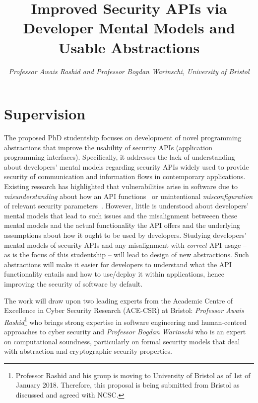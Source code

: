 \documentclass[10pt]{article}
\date{}
\title{\bf{Improved Security APIs via Developer Mental Models and Usable Abstractions}}
\author{\textit{Professor Awais Rashid and Professor Bogdan Warinschi, University of Bristol}}
\begin{document}
\maketitle


\section{Supervision}

The proposed PhD studentship focuses on development of novel programming abstractions that improve the usability of security APIs (application programming interfaces). Specifically, it addresses the lack of understanding about developers' mental models regarding security APIs widely used to provide security of communication and information flows in contemporary applications. Existing research has highlighted that vulnerabilities arise in software due to \emph{misunderstanding} about how an API functions~\cite{nadi2016} or unintentional \emph{misconfiguration} of relevant security parameters~\cite{enck2011, fahl2012}. However, little is understood about developers' mental models that lead to such issues and the misalignment betweeen these mental models and the actual functionality the API offers and the underlying assumptions about how it ought to be used by developers. Studying developers' mental models of security APIs and any misalignment with \emph{correct} API usage -- as is the focus of this studentship -- will lead to design of new abstractions. Such abstractions will make it easier for developers to understand what the API functionality entails and how to use/deploy it within applications, hence improving the security of software by default. 

The work will draw upon two leading experts from the Academic Centre of Excellence in Cyber Security Research (ACE-CSR) at Bristol: \textit{Professor Awais Rashid}\footnote{Professor Rashid and his group is moving to University of Bristol as of 1st of January 2018. Therefore, this proposal is being submitted from Bristol as discussed and agreed with NCSC.} who brings strong expertise in software engineering and human-centred approaches to cyber security and \textit{Professor Bogdan Warinschi} who is an expert on computational soundness, particularly on formal security models that deal with abstraction and cryptographic security properties. 
\end{document}
